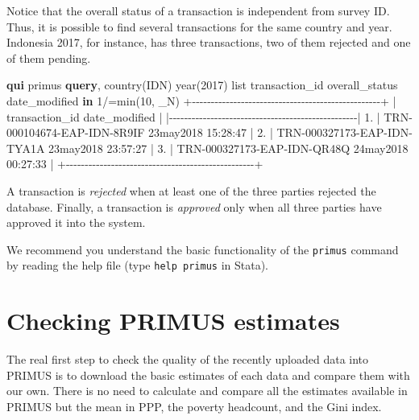 \documentclass[
]{book}
\newenvironment{Shaded}{\begin{snugshade}}{\end{snugshade}}
\newcommand{\FunctionTok}[1]{\textcolor[rgb]{0.00,0.00,0.00}{#1}}
\newcommand{\KeywordTok}[1]{\textcolor[rgb]{0.13,0.29,0.53}{\textbf{#1}}}
\newcommand{\NormalTok}[1]{#1}
\newcommand{\OtherTok}[1]{\textcolor[rgb]{0.56,0.35,0.01}{#1}}
\begin{document}
Notice that the overall status of a transaction is independent from survey ID.
Thus, it is possible to find several transactions for the same country and year.
Indonesia 2017, for instance, has three transactions, two of them rejected and
one of them pending.

\begin{Shaded}
\begin{Highlighting}[]
\KeywordTok{qui}\NormalTok{ primus }\KeywordTok{query}\NormalTok{, country(IDN) }\FunctionTok{year}\NormalTok{(2017)}
\OtherTok{list}\NormalTok{ transaction\_id overall\_status date\_modified }\KeywordTok{in}\NormalTok{ 1/}\OtherTok{\textasciigrave{}=min(10, \_N)\textquotesingle{}}
\NormalTok{     +{-}{-}{-}{-}{-}{-}{-}{-}{-}{-}{-}{-}{-}{-}{-}{-}{-}{-}{-}{-}{-}{-}{-}{-}{-}{-}{-}{-}{-}{-}{-}{-}{-}{-}{-}{-}{-}{-}{-}{-}{-}{-}{-}{-}{-}{-}{-}{-}{-}{-}+}
\NormalTok{     |              transaction\_id        date\_modified |}
\NormalTok{     |{-}{-}{-}{-}{-}{-}{-}{-}{-}{-}{-}{-}{-}{-}{-}{-}{-}{-}{-}{-}{-}{-}{-}{-}{-}{-}{-}{-}{-}{-}{-}{-}{-}{-}{-}{-}{-}{-}{-}{-}{-}{-}{-}{-}{-}{-}{-}{-}{-}{-}|}
\NormalTok{  1. | TRN{-}000104674{-}EAP{-}IDN{-}8R9IF   23may2018 15:28:47 |}
\NormalTok{  2. | TRN{-}000327173{-}EAP{-}IDN{-}TYA1A   23may2018 23:57:27 |}
\NormalTok{  3. | TRN{-}000327173{-}EAP{-}IDN{-}QR48Q   24may2018 00:27:33 |}
\NormalTok{     +{-}{-}{-}{-}{-}{-}{-}{-}{-}{-}{-}{-}{-}{-}{-}{-}{-}{-}{-}{-}{-}{-}{-}{-}{-}{-}{-}{-}{-}{-}{-}{-}{-}{-}{-}{-}{-}{-}{-}{-}{-}{-}{-}{-}{-}{-}{-}{-}{-}{-}+}
\end{Highlighting}
\end{Shaded}

A transaction is \emph{rejected} when at least one of the three parties rejected the
database. Finally, a transaction is \emph{approved} only when all three parties have
approved it into the system.

We recommend you understand the basic functionality of the \texttt{primus} command by
reading the help file (type \texttt{help\ primus} in Stata).

\hypertarget{checking-primus-estimates}{%
\section{Checking PRIMUS estimates}\label{checking-primus-estimates}}

The real first step to check the quality of the recently uploaded data into
PRIMUS is to download the basic estimates of each data and compare them with our
own. There is no need to calculate and compare all the estimates available in
PRIMUS but the mean in PPP, the poverty headcount, and the Gini index.
\end{document}
